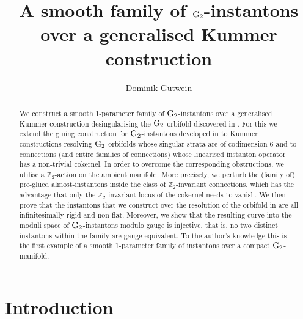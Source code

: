 \documentclass[11pt,a4paper]{scrartcl}
\title{A smooth family of $\G_2$-instantons over a generalised Kummer construction}
\author{Dominik Gutwein}
\newcommand{\G}{\textup{G}}
\numberwithin{equation}{section}
\theoremstyle{plain}
\theoremstyle{definition}
\theoremstyle{remark}
\begin{document}
\maketitle

\begin{abstract}
We construct a smooth 1-parameter family of $\G_2$-instantons over a generalised Kummer construction desingularising the $\G_2$-orbifold discovered in \cite[Example~18]{Joyce-GeneralisedKummer2}. For this we extend the gluing construction for $\G_2$-instantons developed in \cite{Walpuski-InstantonsKummer} to Kummer constructions resolving $\G_2$-orbifolds whose singular strata are of codimension 6 and to connections (and entire families of connections) whose linearised instanton operator has a non-trivial cokernel. In order to overcome the corresponding obstructions, we utilise a $\mathbb{Z}_2$-action on the ambient manifold. More precisely, we perturb the (family of) pre-glued almost-instantons inside the class of $\mathbb{Z}_2$-invariant connections, which has the advantage that only the $\mathbb{Z}_2$-invariant locus of the cokernel needs to vanish. We then prove that the instantons that we construct over the resolution of the orbifold in \cite[Example~18]{Joyce-GeneralisedKummer2} are all infinitesimally rigid and non-flat. Moreover, we show that the resulting curve into the moduli space of $\G_2$-instantons modulo gauge is injective, that is, no two distinct instantons within the family are gauge-equivalent. To the author's knowledge this is the first example of a smooth 1-parameter family of instantons over a compact $\G_2$-manifold.
\end{abstract}

\section{Introduction}
\end{document}
